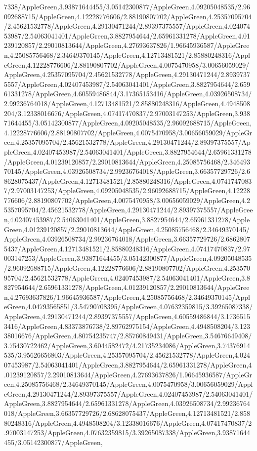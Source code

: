 {\begin{tikzternal}
7338/AppleGreen,3.93871644455/3.05142300877/AppleGreen,4.09205048535/2.96092688715/AppleGreen,4.12228776606/2.88190807702/AppleGreen,4.25357095704/2.45621532778/AppleGreen,4.29130471244/2.89397375557/AppleGreen,4.02407453987/2.54063041401/AppleGreen,3.8827954644/2.65961331278/AppleGreen,4.01239120857/2.29010813644/AppleGreen,4.27693637826/1.96645936587/AppleGreen,4.25085756468/2.34649370145/AppleGreen,4.12713481521/2.85880248316/AppleGreen,4.12228776606/2.88190807702/AppleGreen,4.0075470958/3.00656059029/AppleGreen,4.25357095704/2.45621532778/AppleGreen,4.29130471244/2.89397375557/AppleGreen,4.02407453987/2.54063041401/AppleGreen,3.8827954644/2.65961331278/AppleGreen,4.60559486844/3.17365153416/AppleGreen,4.03926508734/2.99236764018/AppleGreen,4.12713481521/2.85880248316/AppleGreen,4.4948508204/3.12338016676/AppleGreen,4.07417470837/2.97003147253/AppleGreen,3.93871644455/3.05142300877/AppleGreen,4.09205048535/2.96092688715/AppleGreen,4.12228776606/2.88190807702/AppleGreen,4.0075470958/3.00656059029/AppleGreen,4.25357095704/2.45621532778/AppleGreen,4.29130471244/2.89397375557/AppleGreen,4.02407453987/2.54063041401/AppleGreen,3.8827954644/2.65961331278/AppleGreen,4.01239120857/2.29010813644/AppleGreen,4.25085756468/2.34649370145/AppleGreen,4.03926508734/2.99236764018/AppleGreen,3.66357729726/2.68628075437/AppleGreen,4.12713481521/2.85880248316/AppleGreen,4.07417470837/2.97003147253/AppleGreen,4.09205048535/2.96092688715/AppleGreen,4.12228776606/2.88190807702/AppleGreen,4.0075470958/3.00656059029/AppleGreen,4.25357095704/2.45621532778/AppleGreen,4.29130471244/2.89397375557/AppleGreen,4.02407453987/2.54063041401/AppleGreen,3.8827954644/2.65961331278/AppleGreen,4.01239120857/2.29010813644/AppleGreen,4.25085756468/2.34649370145/AppleGreen,4.03926508734/2.99236764018/AppleGreen,3.66357729726/2.68628075437/AppleGreen,4.12713481521/2.85880248316/AppleGreen,4.07417470837/2.97003147253/AppleGreen,3.93871644455/3.05142300877/AppleGreen,4.09205048535/2.96092688715/AppleGreen,4.12228776606/2.88190807702/AppleGreen,4.25357095704/2.45621532778/AppleGreen,4.02407453987/2.54063041401/AppleGreen,3.8827954644/2.65961331278/AppleGreen,4.01239120857/2.29010813644/AppleGreen,4.27693637826/1.96645936587/AppleGreen,4.25085756468/2.34649370145/AppleGreen,4.04793565851/3.54790708395/AppleGreen,4.07632359815/3.39265087338/AppleGreen,4.29130471244/2.89397375557/AppleGreen,4.60559486844/3.17365153416/AppleGreen,4.83373876738/2.89762975154/AppleGreen,4.4948508204/3.12338016676/AppleGreen,4.80754235747/2.85760849431/AppleGreen,3.54676649408/3.75430722462/AppleGreen,3.6044582472/4.21735234086/AppleGreen,3.74376914535/3.95626656803/AppleGreen,4.25357095704/2.45621532778/AppleGreen,4.02407453987/2.54063041401/AppleGreen,3.8827954644/2.65961331278/AppleGreen,4.01239120857/2.29010813644/AppleGreen,4.27693637826/1.96645936587/AppleGreen,4.25085756468/2.34649370145/AppleGreen,4.0075470958/3.00656059029/AppleGreen,4.29130471244/2.89397375557/AppleGreen,4.02407453987/2.54063041401/AppleGreen,3.8827954644/2.65961331278/AppleGreen,4.03926508734/2.99236764018/AppleGreen,3.66357729726/2.68628075437/AppleGreen,4.12713481521/2.85880248316/AppleGreen,4.4948508204/3.12338016676/AppleGreen,4.07417470837/2.97003147253/AppleGreen,4.07632359815/3.39265087338/AppleGreen,3.93871644455/3.05142300877/AppleGreen,
\end{tikzternal}}
